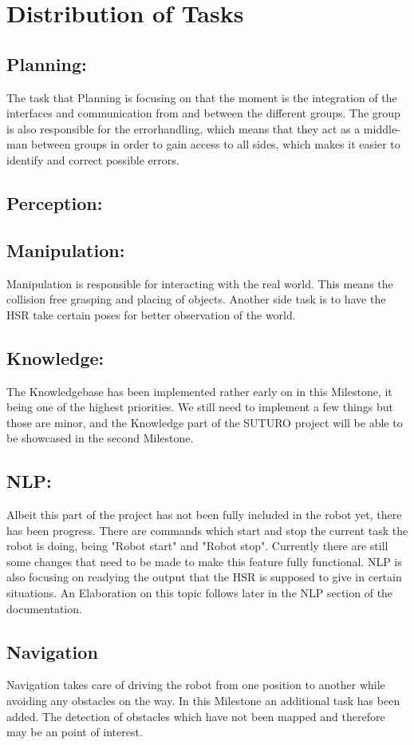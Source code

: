 \documentclass[main.tex]{subfiles}
\begin{document}
	
	\chapter{Distribution of Tasks}

		\section{Planning:}
		The task that Planning is focusing on that the moment is the integration of the interfaces and communication from and between the different groups. The group is also responsible for the errorhandling, which means that they act as a middle-man between groups in order to gain access to all sides, which makes it easier to identify and correct possible errors.
		
		\section{Perception:}
		
		
		\section{Manipulation:}
		Manipulation is responsible for interacting with the real world. This means the collision free grasping and placing of objects. Another side task is to have the HSR take certain poses for better observation of the world. 
		
		\section{Knowledge:}
		The Knowledgebase has been implemented rather early on in this Milestone, it being one of the highest priorities. We still need to implement a few things but those are minor, and the Knowledge part of the SUTURO project will be able to be showcased in the second Milestone. 
		
		\section{NLP:}
		Albeit this part of the project has not been fully included in the robot yet, there has been progress. There are commands which start and stop the current task the robot is doing, being "Robot start" and "Robot stop". Currently there are still some changes that need to be made to make this feature fully functional. NLP is also focusing on readying the output that the HSR is supposed to give in certain situations. An Elaboration on this topic follows later in the NLP section of the documentation.  
		
		\section{Navigation}
		Navigation takes care of driving the robot from one position to another while avoiding any obstacles on the way. In this Milestone an additional task has been added. The detection of obstacles which have not been mapped and therefore may be an point of interest.
\end{document}
